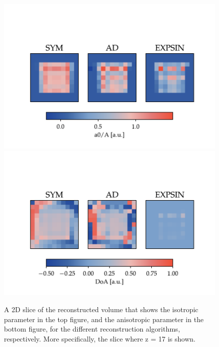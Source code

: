 \begin{figure}[h!]
    \centering
    \includegraphics[trim={0 0cm 0 2.5cm},clip,width=1\textwidth]{./svg-inkscape/P_slices_A_svg-tex.pdf}
    \includegraphics[trim={0 0cm 0 2.5cm},clip,width=1\textwidth]{./svg-inkscape/P_slices_DoA_svg-tex.pdf}
    \caption{ A 2D slice of the reconstructed volume that shows the isotropic parameter in the top figure, and the anisotropic parameter in the bottom figure, for the different reconstruction algorithms, respectively.
        More specifically, the slice where z = 17 is shown.}
    \label{fig:phantom_reconstruction_2D}
\end{figure}

